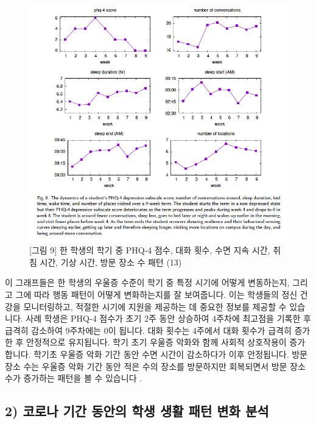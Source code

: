 \documentclass[
  letterpaper,
]{book}
\begin{document}
\begin{figure}[H]

{\centering \includegraphics{img/fig9.png}

}

\caption{{[}그림 9{]} 한 학생의 학기 중 PHQ-4 점수, 대화 횟수, 수면 지속
시간, 취침 시간, 기상 시간, 방문 장소 수 패턴 (13)}

\end{figure}%

이 그래프들은 한 학생의 우울증 수준이 학기 중 특정 시기에 어떻게
변동하는지, 그리고 그에 따라 행동 패턴이 어떻게 변화하는지를 잘
보여줍니다. 이는 학생들의 정신 건강을 모니터링하고, 적절한 시기에 지원을
제공하는 데 중요한 정보를 제공할 수 있습니다. 사례 학생은 PHQ-4 점수가
초기 2주 동안 상승하여 4주차에 최고점을 기록한 후 급격히 감소하여
9주차에는 0이 됩니다. 대화 횟수는 4주에서 대화 횟수가 급격히 증가한 후
안정적으로 유지됩니다. 학기 초기 우울증 악화와 함께 사회적 상호작용이
증가합니다. 학기초 우울증 악화 기간 동안 수면 시간이 감소하다가 이후
안정됩니다. 방문 장소 수는 우울증 악화 기간 동안 적은 수의 장소를
방문하지만 회복되면서 방문 장소 수가 증가하는 패턴을 볼 수 있습니다 .

\subsection{2) 코로나 기간 동안의 학생 생활 패턴 변화
분석}\label{uxcf54uxb85cuxb098-uxae30uxac04-uxb3d9uxc548uxc758-uxd559uxc0dd-uxc0dduxd65c-uxd328uxd134-uxbcc0uxd654-uxbd84uxc11d}
\end{document}

